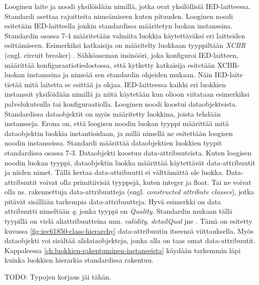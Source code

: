 Looginen laite ja noodi yksilöidään nimillä, jotka ovat yksilöllisiä IED-laitteessa. Standardi asettaa rajoitteita nimeämiseen kuten pituuden. Looginen noodi esitetään IED-laitteella jonkin standardissa määritetyn luokan instanssina. Standardin osassa 7-4 määritetään valmiita luokkia käytettäväksi eri laitteiden esittämiseen. Esimerkiksi katkaisija on määritelty luokkaan tyyppiltään \emph{XCBR} (engl. circuit breaker) \mbox{\cite[s.~105--106]{IEC61850-7-4}}. Sähköaseman insinööri, joka konfiguroi IED-laitteen, määrittää konfiguraatiotiedostossa, että kytketty katkaisija esitetään XCBR-luokan instanssina ja nimeää sen standardin ohjeiden mukaan. Näin IED-laite tietää mitä laitetta se esittää ja ohjaa. IED-laitteessa kaikki eri luokkien instanssit yksilöidään nimillä ja niitä käytetään kun olioon viitataan esimerkiksi palvelukutsulla tai konfiguraatiolla. Looginen noodi koostui dataobjekteista. Standardissa dataobjektit on myös määritetty luokkina, joista tehdään instansseja. Erona on, että loogisen noodin luokan tyyppi määrittää mitä dataobjektin luokkia instantioidaan, ja millä nimellä ne esitettään loogisen noodin instanssissa. Standardi määrittää dataobjektien luokkien tyypit standardissa osassa 7-3. Dataobjekti koostuu data-attribuuteista. Kuten loogisen noodin luokan tyyppi, dataobjektin luokka määrittää käytettävät data-attribuutit ja niiden nimet. Tällä kertaa data-attribuutti ei välttämättä ole luokka. Data-attribuutit voivat olla primitiivisiä tyyppejä, kuten integer ja float. Tai ne voivat olla ns. rakennettuja data-attribuutteja (engl. \emph{constructed attribute classes}), jotka pitävät sisällään tarkempia data-attribuutteja. Hyvä esimerkki on data attribuutti nimeltään \emph{q}, jonka tyyppi on \emph{Quality}. Standardin mukaan tällä tyypillä on vielä aliattribuutteina mm. \emph{validity}, \emph{detailQual} jne \mbox{\cite[s.~11]{IEC61850-7-3}}. Tämä on esitetty kuvassa \ref{fig:iec61850-class-hierarchy} data-attribuutin itseensä viittauksella. Myös dataobjekti voi sisältää alidataobjekteja, jonka alla on taas omat data-attribuutit. Kappaleessa \ref{ch:luokkien-rakentuminen-instanseista} käydään tarkemmin läpi kuinka luokkien hierarkia standardissa rakentuu. \mbox{\cite{IEC61850-1, IEC61850-7-1, IEC61850-7-2, IEC61850-7-3}}

TODO: Typojen korjaus jäi tähän.

